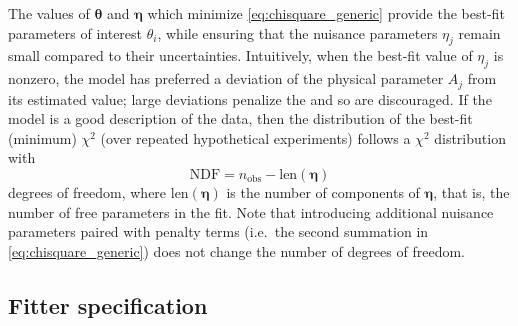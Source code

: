 The values of $\boldsymbol{\theta}$ and $\boldsymbol{\eta}$
which minimize \cref{eq:chisquare_generic}
provide the best-fit parameters of interest $\theta_i$,
while ensuring that the nuisance parameters $\eta_j$
remain small compared to their uncertainties.
Intuitively, when the best-fit value of $\eta_j$ is nonzero,
the model has preferred a deviation of the physical parameter $A_j$ from its estimated value;
large deviations penalize the \chisquare{} and so are discouraged.
If the model is a good description of the data,
then the distribution of the best-fit (minimum) $\chi^2$
(over repeated hypothetical experiments)
follows a $\chi^2$ distribution with
\begin{equation}\label{eq:ndf_def}
    \text{NDF} = n_\text{obs} - \text{len}(\boldsymbol{\eta})
\end{equation}
degrees of freedom,
where $\text{len}(\boldsymbol{\eta})$ is the number of components of $\boldsymbol{\eta}$,
that is, the number of free parameters in the fit.
Note that introducing additional nuisance parameters
paired with penalty terms (i.e.\ the second summation in \cref{eq:chisquare_generic})
does not change the number of degrees of freedom.

\subsection{Fitter specification}
\label{subsec:fitter_specification}


